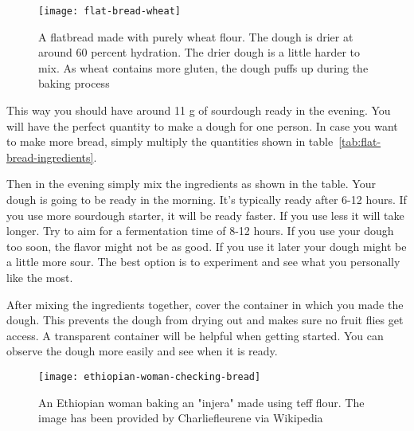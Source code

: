 \begin{figure}[htb!]
  \texttt{[image: flat-bread-wheat]}
  \centering
  \caption{A flatbread made with purely wheat flour. The dough is drier
  at around 60 percent hydration. The drier dough is a little harder
  to mix. As wheat contains more gluten, the dough puffs up during
  the baking process}
\end{figure}

This way you should have around 11 g of sourdough ready in the evening. You will have
the perfect quantity to make a dough for one person. In case you want to make more
bread, simply multiply the quantities shown in table~\ref*{tab:flat-bread-ingredients}.

Then in the evening simply mix the ingredients as shown in the table. Your dough
is going to be ready in the morning. It's typically ready after 6-12 hours. If
you use more sourdough starter, it will be ready faster. If you use less it will take
longer. Try to aim for a fermentation time of 8-12 hours. If you use
your dough too soon, the flavor might not be as good. If you use it later
your dough might be a little more sour. The best option is to experiment
and see what you personally like the most.

After mixing the ingredients together, cover the container in which
you made the dough. This prevents the dough from drying out and makes
sure no fruit flies get access. A transparent container will be helpful
when getting started. You can observe the dough more easily and see when
it is ready.

\begin{figure}[htb!]
  \texttt{[image: ethiopian-woman-checking-bread]}
  \centering
  \caption{An Ethiopian woman baking an "injera" made using teff flour.
  The image has been provided by Charliefleurene via Wikipedia}
\end{figure}

